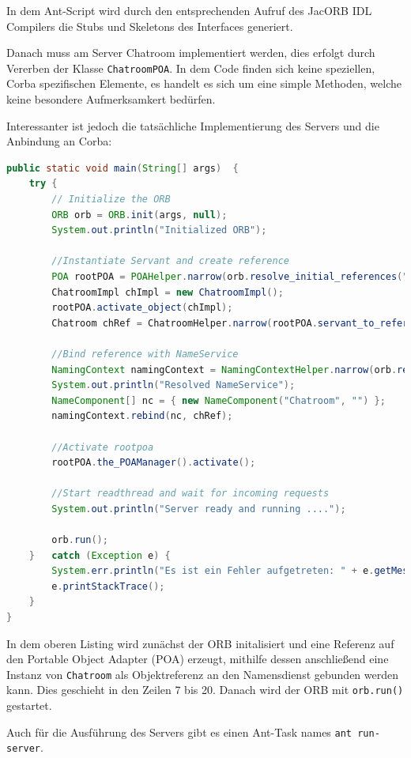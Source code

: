 In dem Ant-Script wird durch den entsprechenden Aufruf des JacORB IDL Compilers die Stubs und Skeletons des Interfaces generiert.

Danach muss am Server Chatroom implementiert werden, dies erfolgt durch Vererben der Klasse \texttt{ChatroomPOA}.
In dem Code finden sich keine speziellen, Corba spezifischen Elemente, es handelt es sich um eine simple Methoden, welche keine besondere Aufmerksamkert bed\"urfen.

Interessanter ist jedoch die tats\"achliche Implementierung des Servers und die Anbindung an Corba:
\begin{lstlisting}[language=Java, caption=Server Main Methode]
public static void main(String[] args)  {
    try {
        // Initialize the ORB
        ORB orb = ORB.init(args, null);
        System.out.println("Initialized ORB");

        //Instantiate Servant and create reference
        POA rootPOA = POAHelper.narrow(orb.resolve_initial_references("RootPOA"));
        ChatroomImpl chImpl = new ChatroomImpl();
        rootPOA.activate_object(chImpl);
        Chatroom chRef = ChatroomHelper.narrow(rootPOA.servant_to_reference(chImpl));

        //Bind reference with NameService
        NamingContext namingContext = NamingContextHelper.narrow(orb.resolve_initial_references("NameService"));
        System.out.println("Resolved NameService");
        NameComponent[] nc = { new NameComponent("Chatroom", "") };
        namingContext.rebind(nc, chRef);

        //Activate rootpoa
        rootPOA.the_POAManager().activate();

        //Start readthread and wait for incoming requests
        System.out.println("Server ready and running ....");

        orb.run();
    }	catch (Exception e)	{
        System.err.println("Es ist ein Fehler aufgetreten: " + e.getMessage());
        e.printStackTrace();
    }
}
\end{lstlisting}

In dem oberen Listing wird zun\"achst der ORB initalisiert und eine Referenz auf den Portable Object Adapter (POA) erzeugt, mithilfe dessen anschlie\ss end eine Instanz von \texttt{Chatroom} als Objektreferenz an den Namensdienst gebunden werden kann.
Dies geschieht in den Zeilen 7 bis 20.
Danach wird der ORB mit \texttt{orb.run()} gestartet.

Auch f\"ur die Ausf\"uhrung des Servers gibt es einen Ant-Task names \texttt{ant run-server}.


